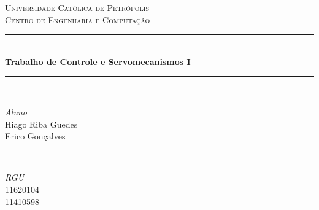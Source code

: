 \documentclass[11pt]{article}
\begin{document}

\begin{titlepage} %
	\newcommand{\HRule}{\rule{\linewidth}{0.5mm}} %
	
	\center %
	
	
	\textsc{\LARGE Universidade Católica de Petrópolis}\\[1.5cm] %
	
	\textsc{\Large Centro de Engenharia e Computação}\\[0.5cm] %
	

	
	
	\HRule\\[0.4cm]
	
	{\huge\bfseries  Trabalho de Controle e Servomecanismos I}\\[0.4cm] %
	
	\HRule\\[1.5cm]
	
	
	\begin{minipage}{0.4\textwidth}
		\begin{flushleft}
			\large
			\textit{Aluno}\\
			Hiago Riba Guedes \\%
			Erico Gonçalves 
		\end{flushleft}
	\end{minipage}
	~
	\begin{minipage}{0.4\textwidth}
		\begin{flushright}
			\large
			\textit{RGU}\\
			11620104 \\
			11410598
		\end{flushright}
	\end{minipage}
	

\end{titlepage}
\end{document}
